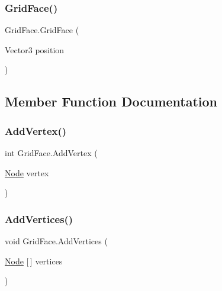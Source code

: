 \mbox{\label{class_grid_face_adb30d4c2fb9f5be07319720fb21481ba}} 
\subsubsection{\texorpdfstring{Grid\+Face()}{GridFace()}\hspace{0.1cm}{\footnotesize\ttfamily [3/3]}}
{\footnotesize\ttfamily Grid\+Face.\+Grid\+Face (\begin{DoxyParamCaption}\item[{Vector3}]{position }\end{DoxyParamCaption})}



\subsection{Member Function Documentation}
\mbox{\label{class_grid_face_af0f04e74e12e9ee8f03a6675ee5a4eab}} 
\subsubsection{\texorpdfstring{Add\+Vertex()}{AddVertex()}}
{\footnotesize\ttfamily int Grid\+Face.\+Add\+Vertex (\begin{DoxyParamCaption}\item[{\mbox{\hyperlink{class_node}{Node}}}]{vertex }\end{DoxyParamCaption})}

\mbox{\label{class_grid_face_a55db6fc7a977c60fd6ce94de473d895c}} 
\subsubsection{\texorpdfstring{Add\+Vertices()}{AddVertices()}}
{\footnotesize\ttfamily void Grid\+Face.\+Add\+Vertices (\begin{DoxyParamCaption}\item[{\mbox{\hyperlink{class_node}{Node}} \mbox{[}$\,$\mbox{]}}]{vertices }\end{DoxyParamCaption})}

